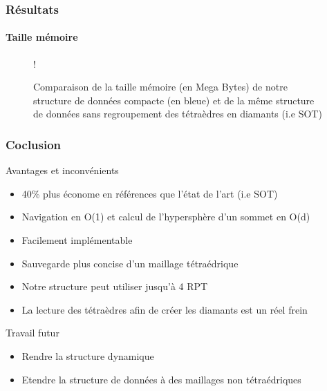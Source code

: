 \documentclass[9pt]{beamer}
\begin{document}
\begin{frame}
\frametitle{Résultats}
\framesubtitle{Taille mémoire}
\begin{figure}[H]
\centering
{} {!}{
\pgfplotsset{width=13cm,height=7cm}
}
\caption{Comparaison de la taille mémoire (en Mega Bytes) de notre structure de données compacte (en bleue) et de la même structure de données sans regroupement des tétraèdres en diamants (i.e SOT)}
\label{fig:taille_memoire}
\end{figure}
\end{frame}

\begin{frame}
\frametitle{Coclusion}
\begin{block}{Avantages et inconvénients}
\begin{itemize}
\color{blue}
\item 40\% plus économe en références que l'état de l'art (i.e SOT)
\item Navigation en O(1) et calcul de l'hypersphère d'un sommet en O(d)
\item Facilement implémentable
\item Sauvegarde plus concise d'un maillage tétraédrique
\color{red}
\item Notre structure peut utiliser jusqu'à 4 RPT
\item La lecture des tétraèdres afin de créer les diamants est un réel frein
\end{itemize}
\color{blue}
\end{block}
\begin{block}{Travail futur}
\begin{itemize}
\item Rendre la structure dynamique
\item Etendre la structure de données à des maillages non tétraédriques
\end{itemize}
\end{block}
\end{frame}
\end{document}
